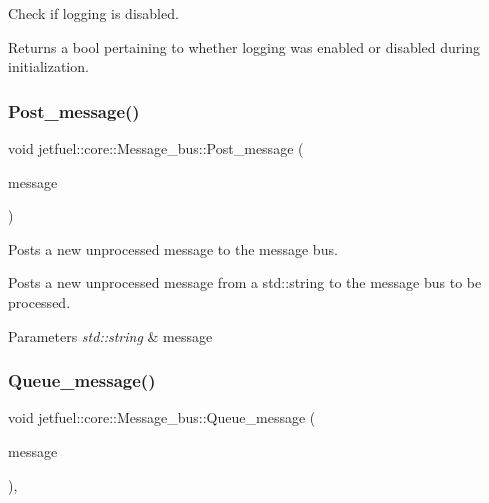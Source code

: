 Check if logging is disabled. 

Returns a bool pertaining to whether logging was enabled or disabled during initialization. \mbox{\label{classjetfuel_1_1core_1_1Message__bus_a7a36c1ebc19327ddb554d6f8199a6965}} 
\subsubsection{\texorpdfstring{Post\+\_\+message()}{Post\_message()}}
{\footnotesize\ttfamily void jetfuel\+::core\+::\+Message\+\_\+bus\+::\+Post\+\_\+message (\begin{DoxyParamCaption}\item[{const std\+::string}]{message }\end{DoxyParamCaption})}



Posts a new unprocessed message to the message bus. 

Posts a new unprocessed message from a std\+::string to the message bus to be processed.


\begin{DoxyParams}{Parameters}
{\em std\+::string} & message \\
\hline
\end{DoxyParams}
\mbox{\label{classjetfuel_1_1core_1_1Message__bus_a76c25f2b2e8aa7a9cf523b1965dd9953}} 
\subsubsection{\texorpdfstring{Queue\+\_\+message()}{Queue\_message()}}
{\footnotesize\ttfamily void jetfuel\+::core\+::\+Message\+\_\+bus\+::\+Queue\+\_\+message (\begin{DoxyParamCaption}\item[{const std\+::string}]{message }\end{DoxyParamCaption})\hspace{0.3cm}{\ttfamily [inline]}, {\ttfamily [protected]}}



